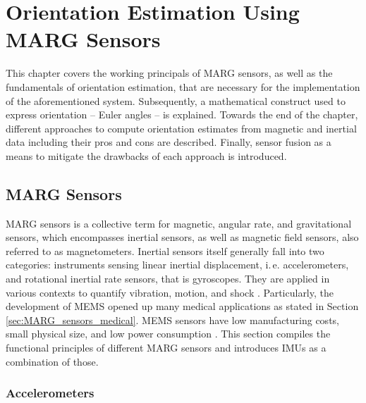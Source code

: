\chapter{Orientation Estimation Using MARG Sensors}
\label{ch:orientation_estimation}

This chapter covers the working principals of MARG sensors, as well as the fundamentals of orientation estimation, that are necessary for the implementation of the aforementioned system. Subsequently, a mathematical construct used to express orientation -- Euler angles -- is explained. Towards the end of the chapter, different approaches to compute orientation estimates from magnetic and inertial data including their pros and cons are described. Finally, sensor fusion as a means to mitigate the drawbacks of each approach is introduced.

\section{MARG Sensors}

MARG sensors is a collective term for magnetic, angular rate, and gravitational sensors, which encompasses inertial sensors, as well as magnetic field sensors, also referred to as magnetometers. Inertial sensors itself generally fall into two categories: instruments sensing linear inertial displacement, i.\,e. accelerometers, and rotational inertial rate sensors, that is gyroscopes. They are applied in various contexts to quantify vibration, motion, and shock \cite{bhattacharyya_inertial_sensors_applications_13}. Particularly, the development of \gls{MEMS} opened up many medical applications as stated in Section \ref{sec:MARG_sensors_medical}. MEMS sensors have low manufacturing costs, small physical size, and low power consumption \cite{bhattacharyya_inertial_sensors_applications_13}. This section compiles the functional principles of different MARG sensors and introduces \glspl{IMU} as a combination of those.

\subsection{Accelerometers}\label{sec:accelerometers}

